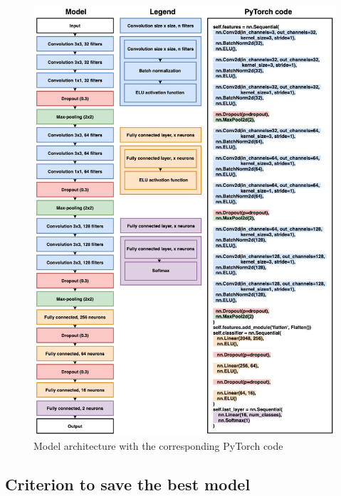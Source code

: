 \begin{figure}[!h]
\centering
\includegraphics[width=1\textwidth, keepaspectratio=true]{./figures/model_paper_manual.png}
\caption{Model architecture with the corresponding PyTorch code}
\label{fig:paper_model}
\end{figure}
\subsection{Criterion to save the best model}
